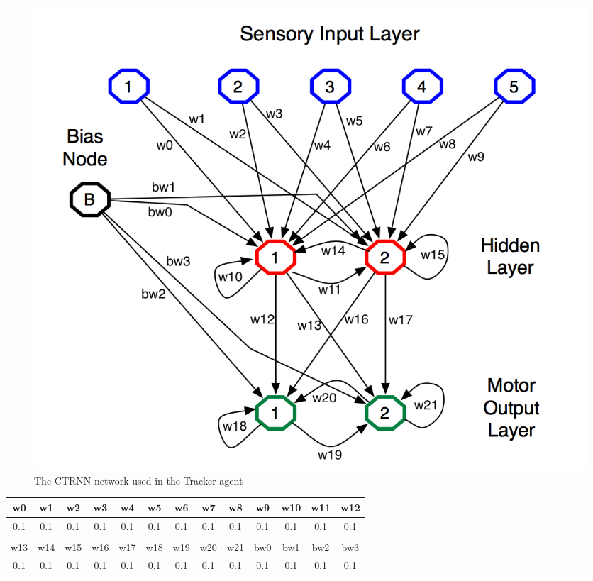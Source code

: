 \begin{figure}[H]
  \centering
    \includegraphics[width=1.0\textwidth]{img/CTRNN}
    \caption{The CTRNN network used in the Tracker agent}
\end{figure}

\begin{tabular}{c | c | c | c | c | c | c | c | c | c | c | c | c }

w0  & w1  & w2  & w3  & w4  & w5  & w6  & w7  & w8  & w9  & w10 & w11 & w12 \\
\hline
0.1 & 0.1 & 0.1 & 0.1 & 0.1 & 0.1 & 0.1 & 0.1 & 0.1 & 0.1 & 0.1 & 0.1 & 0.1 \\ \\

w13 & w14 & w15 & w16 & w17 & w18 & w19 & w20 & w21 & bw0 & bw1 & bw2 & bw3 \\
\hline
0.1 & 0.1 & 0.1 & 0.1 & 0.1 & 0.1 & 0.1 & 0.1 & 0.1 & 0.1 & 0.1 & 0.1 & 0.1 \\

\end{tabular}
